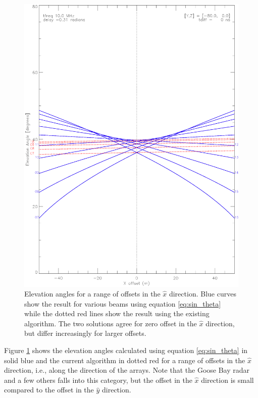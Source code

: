 \documentclass{article}
\begin{document}
\begin{figure}[tb]
\includegraphics[scale=.8]{10MHz_X.ps}
\caption{Elevation angles for a range of offsets in the $\hat{x}$ direction.
Blue curves show the result for various beams using equation
\ref{eq:sin_theta} while the dotted red lines show the result using the
existing algorithm. The two solutions agree for zero offset in the $\hat{x}$
direction, but differ increasingly for larger offsets.}
\label{fig:dX}
\end{figure}

\noindent
Figure \ref{fig:dX} shows the elevation angles calculated using equation
\ref{eq:sin_theta} in solid blue and the current algorithm in dotted red
for a range of offsets in the $\hat{x}$ direction, i.e., along the direction
of the arrays. Note that the Goose Bay radar and a few others falls into this
category, but the offset in the $\hat{x}$ direction is small compared to the
offset in the $\hat{y}$ direction. \\
\end{document}
